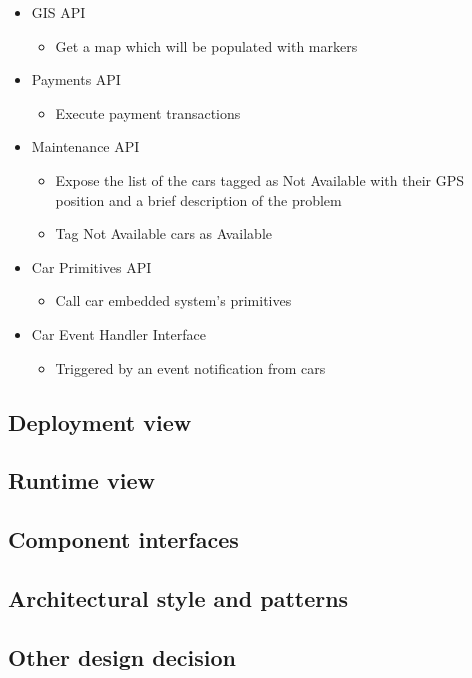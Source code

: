 \begin{itemize}
	\item GIS API
	\begin{itemize}
		\item Get a map which will be populated with markers
	\end{itemize}
	
	\item Payments API
	\begin{itemize}
		\item Execute payment transactions
	\end{itemize}
	
	\item Maintenance API
	\begin{itemize}
		\item Expose the list of the cars tagged as Not Available with their GPS position and a brief description of the problem
		\item Tag Not Available cars as Available
	\end{itemize}
	
	\item Car Primitives API
	\begin{itemize}
		\item Call car embedded system's primitives
	\end{itemize}
	
	\item Car Event Handler Interface 
	\begin{itemize}
		\item Triggered by an event notification from cars
	\end{itemize}
\end{itemize}

\subsection{Deployment view}
\subsection{Runtime view}
\subsection{Component interfaces}
\subsection{Architectural style and patterns}
\subsection{Other design decision}